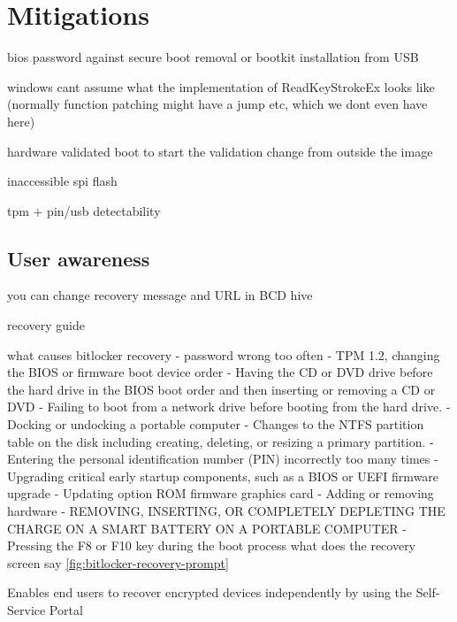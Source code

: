 \section{Mitigations}

bios password against secure boot removal or bootkit installation from USB

windows cant assume what the implementation of ReadKeyStrokeEx looks like (normally function patching might have a jump etc, which we dont even have here)

hardware validated boot to start the validation change from outside the image

inaccessible spi flash

tpm + pin/usb detectability

\subsection{User awareness}

you can change recovery message and URL in BCD hive



recovery guide

what causes bitlocker recovery
- password wrong too often
- TPM 1.2, changing the BIOS or firmware boot device order
- Having the CD or DVD drive before the hard drive in the BIOS boot order and then inserting or removing a CD or DVD
- Failing to boot from a network drive before booting from the hard drive.
- Docking or undocking a portable computer
- Changes to the NTFS partition table on the disk including creating, deleting, or resizing a primary partition.
- Entering the personal identification number (PIN) incorrectly too many times
- Upgrading critical early startup components, such as a BIOS or UEFI firmware upgrade
- Updating option ROM firmware graphics card
- Adding or removing hardware
- REMOVING, INSERTING, OR COMPLETELY DEPLETING THE CHARGE ON A SMART BATTERY ON A PORTABLE COMPUTER
- Pressing the F8 or F10 key during the boot process
what does the recovery screen say \autoref{fig:bitlocker-recovery-prompt}

Enables end users to recover encrypted devices independently by using the Self-Service Portal

